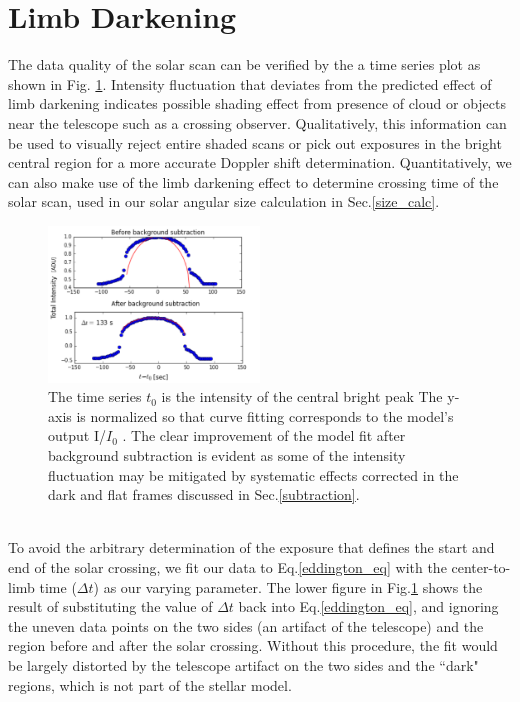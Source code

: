\documentclass[authoryear, 12pt,5p, times]{elsarticle}
\begin{document}
\section{Limb Darkening}
The data quality of the solar scan can be verified by the a time series plot as shown in Fig. \ref{eddington_fit}. Intensity fluctuation that deviates from the predicted effect of limb darkening indicates possible shading effect from presence of cloud or objects near the telescope such as a crossing observer. Qualitatively, this information can be used to visually reject entire shaded scans or pick out exposures in the bright central region for a more accurate Doppler shift determination. Quantitatively, we can also make use of the limb darkening effect to determine crossing time of the solar scan, used in our solar angular size calculation in Sec.\ref{size_calc}.
\\
\begin{figure}[h!]
\includegraphics[width=0.5\textwidth]{figures/eddington_fit}
\caption{ The time series 
$t_0$ is the intensity of the central bright peak
The y-axis is normalized so that curve fitting corresponds to the model's output I/$I_0$ . The clear improvement of the model fit after background subtraction is evident as some of the intensity fluctuation may be mitigated by systematic effects corrected in the dark and flat frames discussed in Sec.\ref{subtraction}. }
\label{eddington_fit}
\end{figure}
\\
To avoid the arbitrary determination of the exposure that defines the start and end of the solar crossing, we fit our data to Eq.\ref{eddington_eq} with the center-to-limb time ($\Delta t$) as our varying parameter.  The lower figure in Fig.\ref{eddington_fit} shows the result of substituting the value of $\Delta t$ back into Eq.\ref{eddington_eq}, and ignoring the uneven data points on the two sides  (an artifact of the telescope) and the region before and after the solar crossing. Without this procedure, the fit would be largely distorted by the telescope artifact on the two sides and the ``dark" regions, which is not part of the stellar model. 
\end{document}
